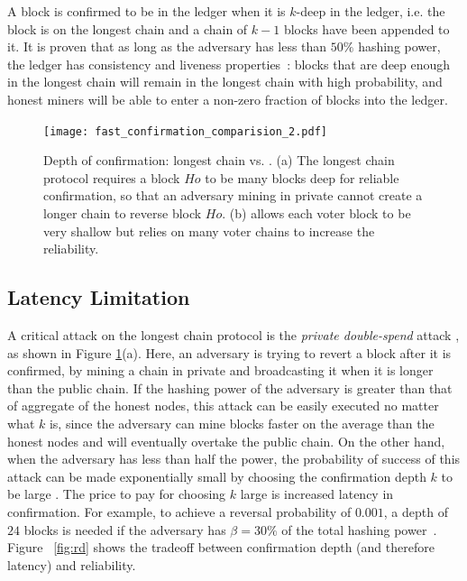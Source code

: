  A block is confirmed to be in the ledger when it is $k$-deep in the ledger, i.e. the block is on the longest chain and a chain of $k-1$ blocks have been appended to it. It is proven that as long as the adversary has less than $50\%$ hashing power, the ledger has consistency and liveness properties~\cite{backbone}: blocks that are deep enough in the longest chain will remain in the longest chain with high probability, and honest miners will be able to enter a non-zero fraction of blocks into the ledger. 

\begin{figure}
\begin{center}
\texttt{[image: fast\_confirmation\_comparision\_2.pdf]}
\end{center}
\caption{\small Depth of confirmation: longest chain vs. \prism. (a) The longest chain protocol requires a block $Ho$ to be many blocks deep for reliable confirmation, so that an adversary mining in private cannot create a longer chain to reverse block $Ho$. (b) \prism allows each voter block to be very shallow but relies on many voter chains to increase the reliability.}
\label{fig:double_spend}
\end{figure}

\subsection{Latency Limitation}
\label{s:lc-latency}
A critical attack on the longest chain protocol is the {\em private  double-spend} attack \cite{bitcoin}, as shown in Figure \ref{fig:double_spend}(a). Here, an adversary is trying to revert a block after it is confirmed, by mining a chain in private and broadcasting it when it is longer than the public chain. If the hashing power of the adversary is greater than that of aggregate of the honest nodes, this attack can be easily executed no matter what $k$ is, since the adversary can mine blocks faster on the average than the honest nodes and will eventually  overtake the public chain. On the other hand, when the adversary has less than half the power, the probability of success of this attack can be made exponentially small by choosing the confirmation depth $k$ to be large \cite{bitcoin}. The price to pay for choosing $k$ large is increased latency in confirmation. For example, to achieve a reversal probability of  $0.001$, a depth of $24$ blocks is needed if the adversary has $\beta = 30\%$ of the total hashing power~\cite{bitcoin}.  Figure ~\ref{fig:rd} shows the tradeoff between confirmation depth (and therefore latency) and reliability.


